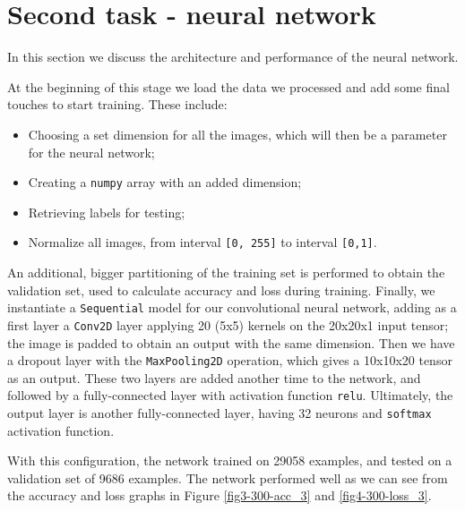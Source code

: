 \vspace{1.5cm} \par
\section*{Second task - neural network}\label{second-task---neural-network}
In this section we discuss the architecture and performance of the neural network.

At the beginning of this stage we load the data we processed and add some final touches to start training. These include:
\begin{itemize}
	\item Choosing a set dimension for all the images, which will then be a parameter for the neural network;
	\item Creating a \texttt{numpy} array with an added dimension;
	\item Retrieving labels for testing;
	\item Normalize all images, from interval \texttt{[0, 255]} to interval \texttt{[0,1]}.
\end{itemize}

An additional, bigger partitioning of the training set is performed to obtain the validation set, used to calculate accuracy and loss during training. Finally, we instantiate a \texttt{Sequential} model for our convolutional neural network, adding as a first layer a \texttt{Conv2D} layer applying 20 (5x5) kernels on the 20x20x1 input tensor; the image is padded to obtain an output with the same dimension. Then we have a dropout layer with the \texttt{MaxPooling2D} operation, which gives a 10x10x20 tensor as an output. These two layers are added another time to the network, and followed by a fully-connected layer with activation function \texttt{relu}. Ultimately, the output layer is another fully-connected layer, having 32 neurons and \texttt{softmax} activation function.

With this configuration, the network trained on 29058 examples, and tested on a validation set of 9686 examples. The network performed well as we can see from the accuracy and loss graphs in Figure \ref{fig3-300-acc_3} and \ref{fig4-300-loss_3}.

